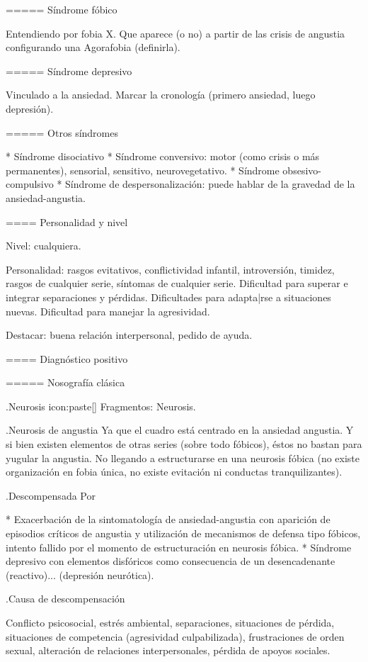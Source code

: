 ===== Síndrome fóbico

Entendiendo por fobia X. Que aparece (o no) a partir de las crisis de angustia configurando una Agorafobia (definirla).

===== Síndrome depresivo

Vinculado a la ansiedad. Marcar la cronología (primero ansiedad, luego depresión).

===== Otros síndromes

* Síndrome disociativo
* Síndrome conversivo: motor (como crisis o más permanentes), sensorial, sensitivo, neurovegetativo.
* Síndrome obsesivo-compulsivo
* Síndrome de despersonalización: puede hablar de la gravedad de la ansiedad-angustia.

==== Personalidad y nivel

Nivel: cualquiera.

Personalidad: rasgos evitativos, conflictividad infantil, introversión, timidez, rasgos de cualquier serie, síntomas de cualquier serie. Dificultad para superar e integrar separaciones y pérdidas. Dificultades para adapta|rse a situaciones nuevas. Dificultad para manejar la agresividad.

Destacar: buena relación interpersonal, pedido de ayuda.

==== Diagnóstico positivo

===== Nosografía clásica

.Neurosis
icon:paste[] Fragmentos: Neurosis.

.Neurosis de angustia
Ya que el cuadro está centrado en la ansiedad angustia. Y si bien existen elementos de otras series (sobre todo fóbicos), éstos no bastan para yugular la angustia. No llegando a estructurarse en una neurosis fóbica (no existe organización en fobia única, no existe evitación ni conductas tranquilizantes).

.Descompensada
Por

* Exacerbación de la sintomatología de ansiedad-angustia con aparición de episodios críticos de angustia y utilización de mecanismos de defensa tipo fóbicos, intento fallido por el momento de estructuración en neurosis fóbica.
* Síndrome depresivo con elementos disfóricos como consecuencia de un desencadenante (reactivo)... (depresión neurótica).

.Causa de descompensación

Conflicto psicosocial, estrés ambiental, separaciones, situaciones de pérdida, situaciones de competencia (agresividad culpabilizada), frustraciones de orden sexual, alteración de relaciones interpersonales, pérdida de apoyos sociales.


